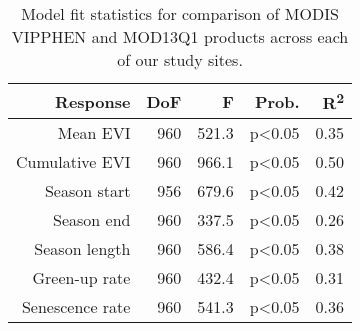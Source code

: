 \begin{table}[h]
\centering
\begin{tabular}{rrrrr}
  \hline
Response & DoF & F & Prob. & R\textsuperscript{2} \\ 
  \hline
Mean EVI & 960 & 521.3 & p<0.05 & 0.35 \\ 
  Cumulative EVI & 960 & 966.1 & p<0.05 & 0.50 \\ 
  Season start & 956 & 679.6 & p<0.05 & 0.42 \\ 
  Season end & 960 & 337.5 & p<0.05 & 0.26 \\ 
  Season length & 960 & 586.4 & p<0.05 & 0.38 \\ 
  Green-up rate & 960 & 432.4 & p<0.05 & 0.31 \\ 
  Senescence rate & 960 & 541.3 & p<0.05 & 0.36 \\ 
   \hline
\end{tabular}
\caption{Model fit statistics for comparison of MODIS VIPPHEN and MOD13Q1 products across each of our study sites.} 
\label{annot_df}
\end{table}

